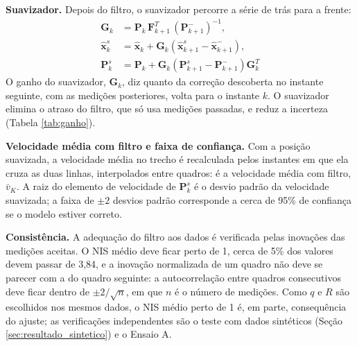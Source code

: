 \documentclass[
    12pt,               %
    openright,          %
    twoside,            %
    a4paper,            %
    chapter=TITLE,      %
    english,            %
    brazil              %
    ]{abntex2}
\begin{document}
\textbf{Suavizador.} Depois do filtro, o suavizador percorre a série de trás para a frente:
\begin{equation} \label{eq:kalman_suavizador}
\begin{aligned}
    \mathbf{G}_k &= \mathbf{P}_k\,\mathbf{F}_{k+1}^T\,\left(\mathbf{P}_{k+1}^-\right)^{-1}, \\
    \hat{\mathbf{x}}_k^s &= \hat{\mathbf{x}}_k + \mathbf{G}_k\left(\hat{\mathbf{x}}_{k+1}^s - \hat{\mathbf{x}}_{k+1}^-\right), \\
    \mathbf{P}_k^s &= \mathbf{P}_k + \mathbf{G}_k\left(\mathbf{P}_{k+1}^s - \mathbf{P}_{k+1}^-\right)\mathbf{G}_k^T
\end{aligned}
\end{equation}
O ganho do suavizador, $\mathbf{G}_k$, diz quanto da correção descoberta no instante seguinte, com as medições posteriores, volta para o instante $k$. O suavizador elimina o atraso do filtro, que só usa medições passadas, e reduz a incerteza (Tabela \ref{tab:ganho}).

\textbf{Velocidade média com filtro e faixa de confiança.} Com a posição suavizada, a velocidade média no trecho é recalculada pelos instantes em que ela cruza as duas linhas, interpolados entre quadros: é a velocidade média com filtro, $\bar{v}_K$. A raiz do elemento de velocidade de $\mathbf{P}_k^s$ é o desvio padrão da velocidade suavizada; a faixa de $\pm 2$ desvios padrão corresponde a cerca de 95\% de confiança se o modelo estiver correto.

\textbf{Consistência.} A adequação do filtro aos dados é verificada pelas inovações das medições aceitas. O NIS médio deve ficar perto de 1, cerca de 5\% dos valores devem passar de 3,84, e a inovação normalizada de um quadro não deve se parecer com a do quadro seguinte: a autocorrelação entre quadros consecutivos deve ficar dentro de $\pm 2/\sqrt{n}$, em que $n$ é o número de medições. Como $q$ e $R$ são escolhidos nos mesmos dados, o NIS médio perto de 1 é, em parte, consequência do ajuste; as verificações independentes são o teste com dados sintéticos (Seção \ref{sec:resultado_sintetico}) e o Ensaio A.
\end{document}
